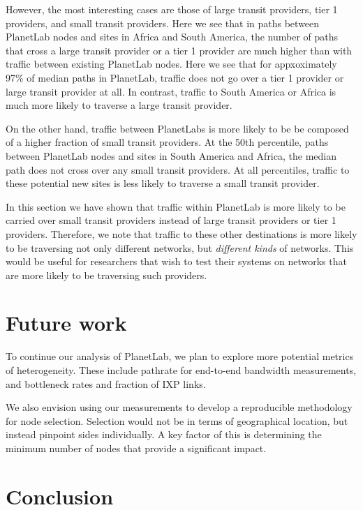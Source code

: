 \documentclass{sig-alternate-10pt}
\begin{document}
However, the most interesting cases are those of large transit providers, tier
1 providers, and small transit providers. Here we see that in paths between
PlanetLab nodes and sites in Africa and South America, the number of paths that
cross a large transit provider or a tier 1 provider are much higher than with
traffic between existing PlanetLab nodes. Here we see that for appxoximately
97\% of median paths in PlanetLab, traffic does not go over a tier 1 provider
or large transit provider at all. In contrast, traffic to South America or
Africa is much more likely to traverse a large transit provider. 

On the other hand, traffic between PlanetLabs is more likely to be be composed
of a higher fraction of small transit providers. At the 50th percentile, paths
between PlanetLab nodes and sites in South America and Africa, the median path
does not cross over any small transit providers. At all percentiles, traffic to
these potential new sites is less likely to traverse a small transit provider.

In this section we have shown that traffic within PlanetLab is more likely to
be carried over small transit providers instead of large transit providers or
tier 1 providers. Therefore, we note that traffic to these other destinations
is more likely to be traversing not only different networks, but
\emph{different kinds} of networks. This would be useful for researchers that
wish to test their systems on networks that are more likely to be traversing
such providers. 


\section{Future work}

To continue our analysis of PlanetLab, we plan to explore more potential metrics
of heterogeneity. These include pathrate for end-to-end bandwidth measurements,
and bottleneck rates and fraction of IXP links. 

We also envision using our measurements to develop a reproducible methodology for
node selection. Selection would not be in terms of geographical location, but 
instead pinpoint sides individually. A key factor of this is determining the 
minimum number of nodes that  provide a significant impact.

\section{Conclusion}
\end{document}
